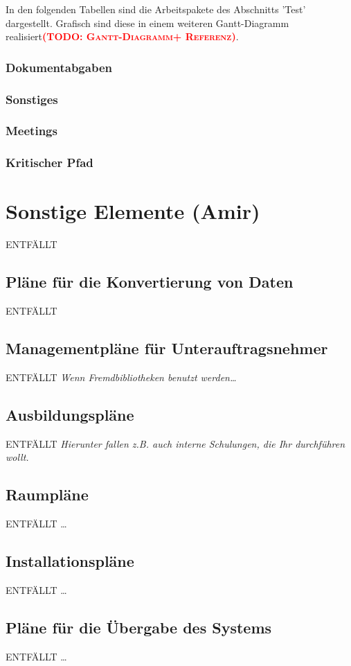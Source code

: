 \documentclass[fontsize=12pt,paper=a4,twoside]{scrartcl}
\newcommand{\todo}[1]{\textbf{\textsc{\textcolor{red}{(TODO: #1)}}}}
\begin{document}
In den folgenden Tabellen sind die Arbeitspakete des Abschnitts 'Test' dargestellt. Grafisch sind diese in einem weiteren Gantt-Diagramm realisiert\todo{Gantt-Diagramm+ Referenz}.


\subsubsection{Dokumentabgaben}\label{aps}

\subsubsection{Sonstiges}\label{aps}

\subsubsection{Meetings}\label{aps}

\subsubsection{Kritischer Pfad}\label{aps}

\section{Sonstige Elemente (Amir)}
ENTFÄLLT
\subsection{Pläne für die Konvertierung von Daten}
ENTFÄLLT

\subsection{Managementpläne für Unterauftragsnehmer}
ENTFÄLLT
{\em Wenn Fremdbibliotheken benutzt werden\dots}

\subsection{Ausbildungspläne}
ENTFÄLLT
{\em Hierunter fallen z.B. auch interne Schulungen, die Ihr
  durchführen wollt.}

\subsection{Raumpläne}
ENTFÄLLT
\dots

\subsection{Installationspläne}
ENTFÄLLT
\dots

\subsection{Pläne für die Übergabe des Systems}
ENTFÄLLT
\dots
\end{document}
